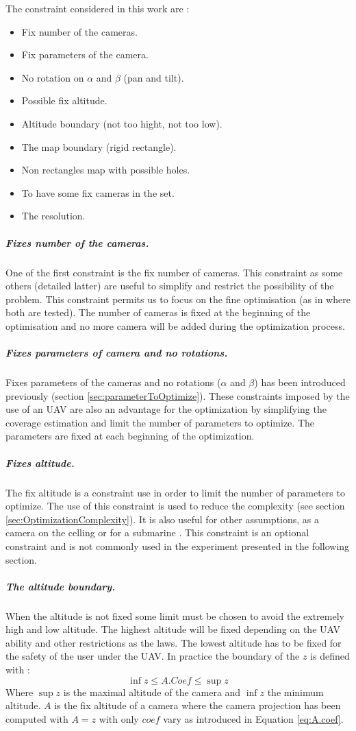 The constraint considered in this work are : 
\begin{itemize}
	\item Fix number of the cameras.
	\item Fix parameters of the camera.
	\item No rotation  on  $\alpha$ and $\beta$ (pan and tilt).
	\item Possible fix altitude.
	\item Altitude boundary (not too hight, not too low).  	
	\item The map boundary (rigid rectangle).  
	\item Non rectangles map with possible holes.
	\item To have some fix cameras in the set. 
	\item The resolution.\\

\end{itemize} 
\subparagraph{Fixes number of the cameras.}
One of the first constraint is the fix number of cameras. This constraint as some others (detailed latter) are  useful to simplify and restrict the possibility of the problem. This constraint permits us to focus on the fine optimisation (as in \citep{22*zhao2008} where both are tested). The number of cameras is fixed at the beginning of the optimisation and no more camera will be added during the optimization process.  

\subparagraph{Fixes parameters of camera and no rotations.}
Fixes parameters of the cameras and no rotations ($\alpha$ and $\beta$) has been introduced previously (section \ref{sec:parameterToOptimize}). These constraints imposed by the use of an UAV are also an advantage for the optimization by simplifying the coverage estimation and limit the number of parameters to optimize. The parameters are fixed at each beginning of the optimization.

\subparagraph{Fixes altitude.}
 The fix altitude is a constraint use in order to limit the number of parameters to optimize. The use of this constraint is used to reduce the complexity (see section \ref{sec:OptimizationComplexity}). It is also useful for other assumptions, as a camera on the celling or for a submarine  \cite{66*galceran2013}. This constraint is an optional constraint and is not commonly used in the experiment presented in the following section.   

\subparagraph{The altitude boundary.}\label{sec:altitudeBoundary}
 When the altitude is not fixed some limit must be chosen to avoid the extremely high and low altitude. The highest altitude will be fixed depending on the UAV ability and other restrictions as the laws. The lowest altitude has to be fixed for the safety of the user under the UAV.  
In practice the boundary of the $z$ is defined with :
 \begin{equation}\label{eq:boundaryZ}
   \inf z\leq A.Coef\leq \sup z  
 \end{equation} 
 Where $\sup z$ is the maximal altitude of the camera and $\inf z$ the minimum altitude. $A$ is the fix altitude  of a camera where the camera projection has been computed with $A=z$ with only $coef$ vary as introduced in Equation \ref{eq:A.coef}. 
 
